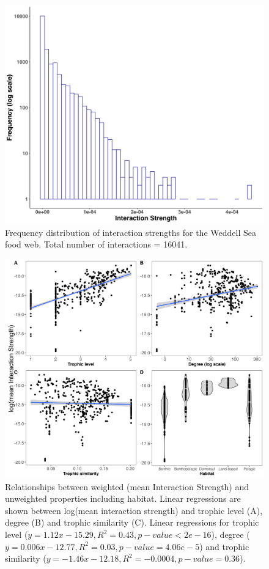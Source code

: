 \documentclass[gc, manuscript]{copernicus}
\begin{document}
\clearpage

\begin{figure}
\includegraphics[width=12cm]{Fig3_IntDist} \caption{Frequency distribution of interaction strengths for the Weddell Sea food web. Total number of interactions = 16041.}\label{fig:unnamed-chunk-3}
\end{figure}

\clearpage

\begin{figure}
\includegraphics[width=12cm]{Fig4_LinReg} \caption{Relationships between weighted (mean Interaction Strength) and unweighted properties including habitat. Linear regressions are shown between log(mean interaction strength) and trophic level (A), degree (B) and trophic similarity (C). Linear regressions for trophic level ($y = 1.12x - 15.29, R^2 = 0.43, p-value < 2e-16$), degree ($y = 0.006x - 12.77, R^2 = 0.03, p-value = 4.06e-5$) and trophic similarity ($y = -1.46x - 12.18, R^2 = -0.0004, p-value = 0.36$).}\label{fig:unnamed-chunk-4}
\end{figure}
\end{document}
